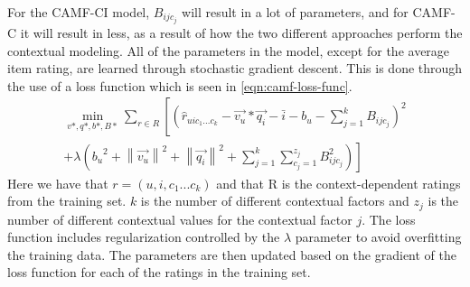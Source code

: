 For the CAMF-CI model, $B_{ijc_j}$ will result in a lot of parameters, and for CAMF-C it will result in less, as a result of how the two different approaches perform the contextual modeling.
All of the parameters in the model, except for the average item rating, are learned through stochastic gradient descent.
This is done through the use of a loss function which is seen in \autoref{eqn:camf-loss-func}.
\begin{equation}
    \label{eqn:camf-loss-func}
    \begin{split}
        \min_{v*, q*, b*, B*}\sum \limits_{r \in  R}\left [ \left (  \hat{r}_{uic_1...c_k} - \vec{v_u} * \vec{q_i} - \bar{i} - b_u - \sum\limits_{j = 1}^k B_{ijc_j}\right )^2 \right. \\
        \left. + \lambda \left({b_u}^2 +{\left \| \vec{v_u} \right \|}^2  + {\left \|\vec{q_i}  \right \|}^2 + \sum\limits_{j = 1}^k \sum\limits_{c_j = 1}^{z_j} B_{ijc_j}^{2}\right ) \right ]
    \end{split}
\end{equation}
Here we have that $r = (u,i,c_1...c_k)$ and that R is the context-dependent ratings from the training set.
$k$ is the number of different contextual factors and $z_j$ is the number of different contextual values for the contextual factor $j$.
The loss function includes regularization controlled by the $\lambda$ parameter to avoid overfitting the training data.
The parameters are then updated based on the gradient of the loss function for each of the ratings in the training set.
